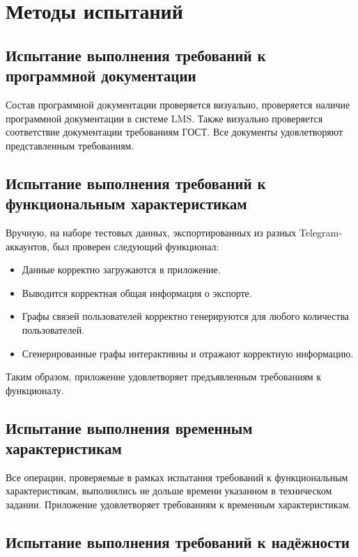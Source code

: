 \section{Методы испытаний}

\subsection{Испытание выполнения требований к программной документации}

Состав программной документации проверяется визуально, проверяется наличие программной документации в системе LMS. Также визуально проверяется соответствие документации требованиям ГОСТ. 
Все документы удовлетворяют представленным требованиям.

\subsection{Испытание выполнения требований к функциональным характеристикам}

Вручную, на наборе тестовых данных, экспортированных из разных Telegram-аккаунтов, был проверен следующий функционал:

\begin{itemize}
    \item Данные корректно загружаются в приложение.
    \item Выводится корректная общая информация о экспорте.
    \item Графы связей пользователей корректно генерируются для любого количества пользователей.
    \item Сгенерированные графы интерактивны и отражают корректную информацию.
\end{itemize}

Таким образом, приложение удовлетворяет предъявленным требованиям к функционалу.

\subsection{Испытание выполнения временным характеристикам}

Все операции, проверяемые в рамках испытания требований к функциональным характеристикам, выполнялись не дольше времени указанном в техническом задании.
Приложение удовлетворяет требованиям к временным характеристикам.

\subsection{Испытание выполнения требований к надёжности}

